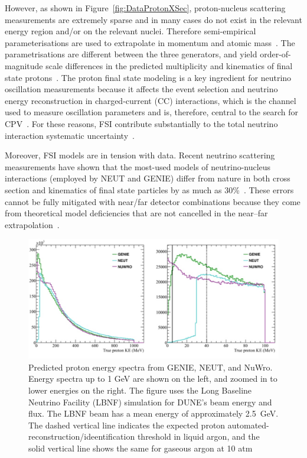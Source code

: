 However, as shown in Figure~\ref{fig:DataProtonXSec}, proton-nucleus scattering measurements are extremely sparse and in many cases do not exist in the relevant energy region and/or on the relevant nuclei.
Therefore semi-empirical parameterisations are used to extrapolate in momentum and atomic mass~\cite{wellisch1996total}.  
The parametrisations are different between the three generators, and yield order-of-magnitude scale differences in the predicted multiplicity and kinematics of final state protons~\cite{dune2018high}.
The proton final state modeling is a key ingredient for neutrino oscillation measurements because it affects the event selection and neutrino energy reconstruction in charged-current (CC) interactions, which is the channel used to measure oscillation parameters and is, therefore, central to the search for CPV~\cite{Abe:2013hdq}.
For these reasons, FSI contribute substantially to the total neutrino interaction systematic uncertainty~\cite{Abe:2019vii}. 

Moreover, FSI models are in tension with data.  
Recent neutrino scattering measurements have shown that the most-used models of neutrino-nucleus interactions (employed by NEUT and GENIE) differ from nature in both cross section and kinematics of final state particles by as much as 30\%~\cite{McFarland:2018aaa}. 
These errors cannot be fully mitigated with near/far detector combinations because they come from theoretical model deficiencies that are not cancelled in the near–far extrapolation~\cite{Coloma:2013rqa}. 

\begin{figure}%
    \centering
    \includegraphics[width=12cm]{files/Figures/protons_from_argon.jpeg}%
    \caption{Predicted proton energy spectra from GENIE, NEUT, and NuWro\cite{Raaf:2018aaa}. Energy spectra up to 1 GeV are shown on the left, and zoomed in to lower energies on the right. The figure uses the Long Baseline Neutrino Facility (LBNF)  simulation for DUNE's beam energy and flux. The LBNF beam has a mean energy of approximately 2.5~GeV\cite{abi2020deep}. The dashed vertical line indicates the expected proton automated-reconstruction/ideentification threshold in liquid argon, and the solid vertical line shows the same for gaseous argon at 10 atm~\cite{dune2018high}}
    \label{fig:protonsfromargon}%
\end{figure}

